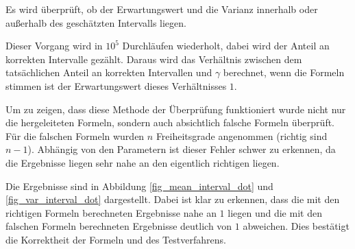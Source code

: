 \documentclass[10pt,twocolumn]{scrartcl}
\begin{document}
		Es wird überprüft, ob der Erwartungswert und die Varianz innerhalb oder außerhalb des geschätzten Intervalls liegen.

		Dieser Vorgang wird in $10^5$ Durchläufen wiederholt, dabei wird der Anteil an korrekten Intervalle gezählt. Daraus wird das Verhältnis zwischen dem tatsächlichen Anteil an korrekten Intervallen und $\gamma$ berechnet, wenn die Formeln stimmen ist der Erwartungswert dieses Verhältnisses $1$.

		Um zu zeigen, dass diese Methode der Überprüfung funktioniert wurde nicht nur die hergeleiteten Formeln, sondern auch absichtlich falsche Formeln überprüft. Für die falschen Formeln wurden $n$ Freiheitsgrade angenommen (richtig sind $n-1$). Abhängig von den Parametern ist dieser Fehler schwer zu erkennen, da die Ergebnisse liegen sehr nahe an den eigentlich richtigen liegen.

		Die Ergebnisse sind in Abbildung \ref{fig_mean_interval_dot} und \ref{fig_var_interval_dot} dargestellt. Dabei ist klar zu erkennen, dass die mit den richtigen Formeln berechneten Ergebnisse nahe an $1$ liegen und die mit den falschen Formeln berechneten Ergebnisse deutlich von $1$ abweichen. Dies bestätigt die Korrektheit der Formeln und des Testverfahrens.
\end{document}

